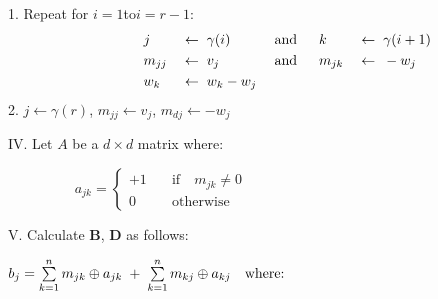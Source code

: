                     \noindent\hspace{20pt}1. Repeat for \mys$i=1$\quad to\quad $i=r-1$:
                    \setlength{\belowdisplayskip}{0pt} %
                    \begin{alignat*}{7}
                                \qquad\qquad & j\mys       & \leftarrow\mys\mys   & \gamma(i)   & \mys\text{and} \quad\mys\mys & k\mys       & \leftarrow\mys\mys   & \gamma(i+1) \\
                                \qquad\qquad & m_{jj}\mys  & \leftarrow\mys\mys   & v_j         & \mys\text{and} \quad\mys\mys & m_{jk}\mys  & \leftarrow\mys\mys   & -w_j \\
                                \qquad\qquad & w_{k}\mys   & \leftarrow\mys\mys   & w_{k} - w_j & \mys                         &\mys         & \mys                 & \mys
                    \end{alignat*}
                    \noindent\hspace{20pt}2. $j\leftarrow\gamma(r)$, $m_{jj}\leftarrow v_j$, $m_{dj}\leftarrow -w_j$


            \noindent IV. Let  $A$ be a $d\times d$ matrix where:

                        \qquad $\hspace{2cm}a_{jk}  =	\scriptscriptstyle{\begin{cases}	%
                                                            +1 & \quad\textrm{if}\quad m_{jk} \neq  0 \\
                                                            0 & \quad\textrm{otherwise}
                                                    \end{cases}
                                                    }$

            \noindent V. Calculate $\boldsymbol{B}$, $\boldsymbol{D}$ as follows:



                    \qquad $b_j = \sum\limits_{k=1}^{n} m_{jk} \oplus a_{jk} \hspace{0.1cm}+\hspace{0.1cm} \sum\limits_{k=1}^{n} m_{kj} \oplus a_{kj} \quad\textrm{where:}$

